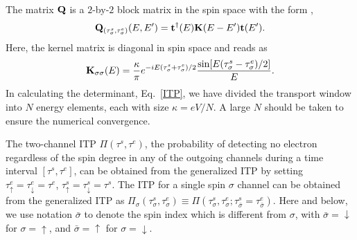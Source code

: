 \documentclass[aps,prb,twocolumn,footinbib,showpacs,superscriptaddress,preprintnumbers,amsmath,amssymb]{revtex4-1}
\begin{document}
The matrix ${\bf Q}$ is a $2$-by-$2$ block matrix in the spin space with the form \cite{WTD_correlated},
\begin{equation}
{\bf Q}_{(\tau_\sigma^s, \tau_\sigma^e)}(E,E') = {\bf t}^\dag (E) {\bf K}(E-E'){\bf t}(E').
\end{equation}
Here, the kernel matrix is diagonal in spin space and reads as \cite{WTD_correlated} 
\begin{equation}
{\bf K}_{\sigma\sigma}(E) = \frac{\kappa}{\pi} e^{-iE(\tau_\sigma^s + \tau_\sigma^e)/2} \frac{\sin[E(\tau_\sigma^s- \tau_\sigma^e)/2]}{E} .
\end{equation}
In calculating the determinant, Eq.~\eqref{ITP}, we have divided the transport window into $N$ energy elements, each with size $\kappa = eV/N$. A large $N$ should be taken to ensure the numerical convergence.


	The two-channel ITP $\Pi(\tau^s,\tau^e)$, the probability of detecting no electron regardless of the spin degree in any of the outgoing channels during a time interval $[\tau^s,\tau^e]$, can be obtained from the generalized ITP by setting $\tau_\uparrow^e=\tau_\downarrow^e=\tau^e$, $\tau_\uparrow^s=\tau_\downarrow^s=\tau^s$. The ITP for a single spin $\sigma$ channel can be obtained from the generalized ITP as $\Pi_\sigma(\tau_\sigma^s, \tau_\sigma^e)\equiv \Pi(\tau_\sigma^s, \tau_\sigma^e; \tau_{\bar{\sigma}}^s=\tau_{\bar{\sigma}}^e)$. Here and below, we use notation $\bar{\sigma}$ to denote the spin index which is different from $\sigma$, with $\bar{\sigma}=\downarrow$ for $\sigma=\uparrow$, and $\bar{\sigma}=\uparrow$ for $\sigma=\downarrow$.
	 
\end{document}
